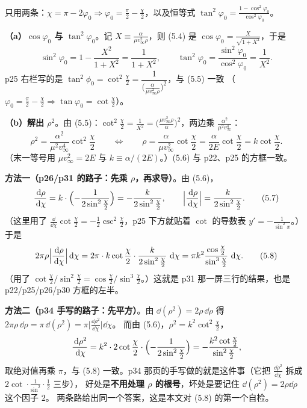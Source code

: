 \documentclass[11pt]{ctexart}
\begin{document}


只用两条：$\chi=\pi-2\varphi_0\Rightarrow\varphi_0=\frac\pi2-\frac\chi2$，以及恒等式 $\tan^2\varphi_0=\frac{1-\cos^2\varphi_0}{\cos^2\varphi_0}$。

\textbf{（a）$\cos\varphi_0$ 与 $\tan^2\varphi_0$}。记 $X\equiv\frac{\alpha}{\mu v_\infty^2\rho}$，则 (5.4) 是 $\cos\varphi_0=\frac{X}{\sqrt{1+X^2}}$，于是
\[
\sin^2\varphi_0=1-\frac{X^2}{1+X^2}=\frac{1}{1+X^2},
\qquad
\tan^2\varphi_0=\frac{\sin^2\varphi_0}{\cos^2\varphi_0}=\frac{1}{X^2} . \tag{5.5}
\]
p25 右栏写的是 $\tan^2\phi_0=\cot^2\frac\chi2=\dfrac{1}{\bigl(\frac{\alpha}{\mu v_\infty^2\rho}\bigr)^2}$，与 (5.5) 一致
（$\varphi_0=\frac\pi2-\frac\chi2\Rightarrow\tan\varphi_0=\cot\frac\chi2$）。

\textbf{（b）解出 $\rho^2$}。由 (5.5)：$\cot^2\frac\chi2=\frac{1}{X^2}=\bigl(\frac{\mu v_\infty^2\rho}{\alpha}\bigr)^2$，两边乘 $\frac{\alpha^2}{\mu^2v_\infty^4}$：
\[
\rho^{2}=\frac{\alpha^{2}}{\mu^{2}v_\infty^{4}}\cot^{2}\frac\chi2
\qquad\Longleftrightarrow\qquad
\rho=\frac{\alpha}{\mu v_\infty^{2}}\cot\frac\chi2=\frac{\alpha}{2E}\cot\frac\chi2=k\cot\frac\chi2 . \tag{5.6}
\]
（末一等号用 $\mu v_\infty^2=2E$ 与 $k\equiv\alpha/(2E)$。）(5.6) 与 p22、p25 的方框一致。


\textbf{方法一（p26/p31 的路子：先乘 $\rho$，再求导）}。由 (5.6)，
\[
\frac{\,\mathrm{d}\rho}{\,\mathrm{d}\chi}=k\cdot\Bigl(-\frac{1}{2\sin^{2}\frac\chi2}\Bigr)=-\frac{k}{2\sin^{2}\frac\chi2},
\qquad
\Bigl|\frac{\,\mathrm{d}\rho}{\,\mathrm{d}\chi}\Bigr|=\frac{k}{2\sin^{2}\frac\chi2} . \tag{5.7}
\]
（这里用了 $\frac{\dd}{\dd\chi}\cot\frac\chi2=-\frac{1}{2}\csc^2\frac\chi2$，p25 下方就贴着 $\cot$ 的导数表 $y'=-\frac{1}{\sin^2x}$。）
于是
\[
2\pi\rho\Bigl|\frac{\,\mathrm{d}\rho}{\,\mathrm{d}\chi}\Bigr|\,\mathrm{d}\chi
=2\pi\cdot k\cot\frac\chi2\cdot\frac{k}{2\sin^2\frac\chi2}\,\,\mathrm{d}\chi
=\pi k^{2}\frac{\cos\frac\chi2}{\sin^{3}\frac\chi2}\,\,\mathrm{d}\chi . \tag{5.8}
\]
（用了 $\cot\frac\chi2/\sin^2\frac\chi2=\cos\frac\chi2/\sin^3\frac\chi2$。）这就是 p31 那一屏三行的结果，也是 p22/p25/p26/p30 方框的左半。

\textbf{方法二（p34 手写的路子：先平方）}。由 $\dd(\rho^2)=2\rho\,\dd\rho$ 得 $2\pi\rho\,\dd\rho=\pi\,\dd(\rho^2)=\pi\bigl|\frac{\dd\rho^2}{\dd\chi}\bigr|\dd\chi$。
而由 (5.6)，$\rho^2=k^2\cot^2\frac\chi2$，
\[
\frac{\,\mathrm{d}\rho^{2}}{\,\mathrm{d}\chi}=k^{2}\cdot2\cot\frac\chi2\cdot\Bigl(-\frac{1}{2\sin^{2}\frac\chi2}\Bigr)=-\frac{k^{2}\cot\frac\chi2}{\sin^{2}\frac\chi2},
\]
取绝对值再乘 $\pi$，与 (5.8) 一致。p34 那页的手写做的就是这件事（它把 $\frac{\dd\rho^2}{\dd\chi}$ 拆成 $2\cot\cdot\frac{1}{\sin^2}\cdot\frac12$ 三步），
好处是\textbf{不用处理 $\rho$ 的根号}，坏处是要记住 $\dd(\rho^2)=2\rho\dd\rho$ 这个因子 $2$。
两条路给出同一个答案，这是本文对 (5.8) 的第一个自检。
\end{document}
